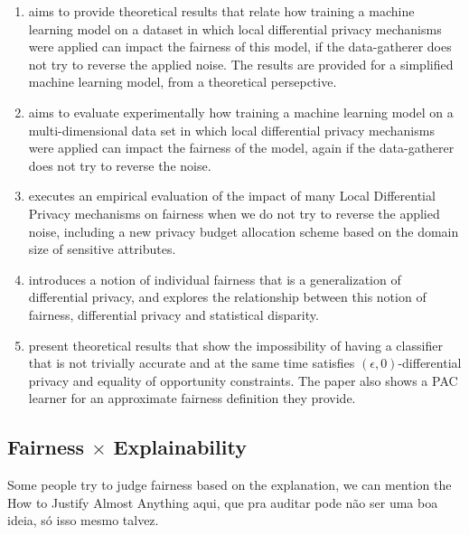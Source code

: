 \begin{enumerate}
\item \cite{A Systematic and Formal Study of the Impact of Local Differential Privacy on Fairness: Preliminary Results} aims to provide theoretical results that relate how training a machine learning model on a dataset in which local differential privacy mechanisms were applied can impact the fairness of this model, if the data-gatherer does not try to reverse the applied noise. The results are provided for a simplified machine learning model, from a theoretical persepctive.
\item \cite{On the impact of multi-dimensional local differential privacy on fairness} aims to evaluate experimentally how training a machine learning model on a multi-dimensional data set in which local differential privacy mechanisms were applied can impact the fairness of the model, again if the data-gatherer does not try to reverse the noise.
\item \cite{(Local) Differential Privacy has NO Disparate Impact on Fairness} executes an empirical evaluation of the impact of many Local Differential Privacy mechanisms on fairness when we do not try to reverse the applied noise, including a new privacy budget allocation scheme based on the domain size of sensitive attributes.
\item \cite{Awareness} introduces a notion of individual fairness that is a generalization of differential privacy, and explores the relationship between this notion of fairness, differential privacy and statistical disparity.
\item \cite{On the Compatibility of Privacy and Fairness} present theoretical results that show the impossibility of having a classifier that is not trivially accurate and at the same time satisfies $(\epsilon,0)$-differential privacy and equality of opportunity constraints. The paper also shows a PAC learner for an approximate fairness definition they provide.
\end{enumerate}

\subsection{Fairness $\times$ Explainability}

{\color{red} Some people try to judge fairness based on the explanation, we can mention the How to Justify Almost Anything aqui, que pra auditar pode não ser uma boa ideia, só isso mesmo talvez.}

